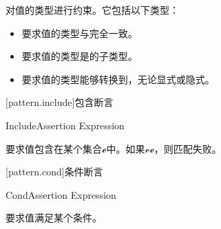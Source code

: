 \pnum
{}对值的类型进行约束。它包括以下类型：

\begin{itemize}
    \item {}要求值的类型与完全一致。
    \item {}要求值的类型是的子类型。
    \item {}要求值的类型能够转换到，无论显式或隐式。
    \end{itemize}

[pattern.include]{包含断言}

\begin{bnf}{IncludeAssertion}
     Expression
\end{bnf}

\pnum
{}要求值包含在某个集合$\mathcal{e}$中。如果$\mathcal{v}$$\mathcal{e}$，则匹配失败。

[pattern.cond]{条件断言}

\begin{bnf}{CondAssertion}
     Expression
\end{bnf}

\pnum
{}要求值满足某个条件。